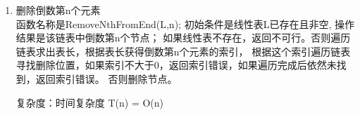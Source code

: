\documentclass[supercite]{Experimental_Report}
\theoremstyle{definition}
\begin{document}
\begin{enumerate}
	\item 删除倒数第n个元素\\
	函数名称是RemoveNthFromEnd(L,n); 初始条件是线性表L已存在且非空, 操作结果是该链表中倒数第n个节点；
	如果线性表不存在，返回不可行。否则遍历链表求出表长，根据表长获得倒数第n个元素的索引，
	根据这个索引遍历链表寻找删除位置，如果索引不大于0，返回索引错误，如果遍历完成后依然未找到，返回索引错误。
	否则删除节点。
	
	复杂度：时间复杂度 T(n) = O(n)
	\begin{figure}[H]
		\centering
		\begin{minipage}{0.7\linewidth}
			\centering

\end{minipage}
\end{figure}
\end{enumerate}
\end{document}
